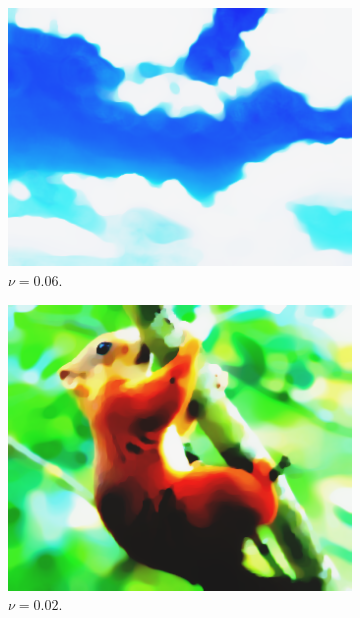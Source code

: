 \documentclass[abstracton]{scrreprt}
\begin{document}
\begin{figure}[!ht]
\begin{subfigure}[b]{0.16\textwidth}
                    \includegraphics[width=\textwidth]{img/segmentation/cr/006blue.png}
                    \caption{$\nu = 0.06$.}
                \end{subfigure}
                \begin{subfigure}[b]{0.16\textwidth}
                    \includegraphics[width=\textwidth]{img/segmentation/cr/002squirrel.png}
                    \caption{$\nu = 0.02$.}
                \end{subfigure}
                \begin{subfigure}[b]{0.16\textwidth}

\end{subfigure}
\end{figure}
\end{document}
